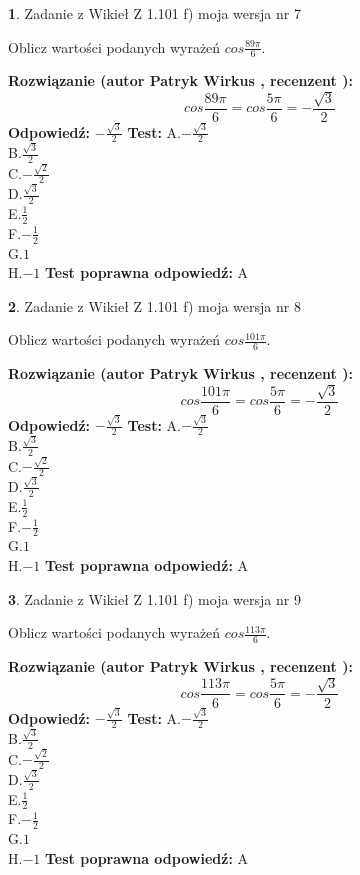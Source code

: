 \documentclass[12pt, a4paper]{article}
\theoremstyle{definition} %
\newtheorem{zad}{}
\newcommand{\zadStart}[1]{\begin{zad}#1\newline}
\newcommand{\zadStop}{\end{zad}}
\newcommand{\rozwStart}[2]{\noindent \textbf{Rozwiązanie (autor #1 , recenzent #2): }\newline}
\newcommand{\rozwStop}{\newline}
\newcommand{\odpStart}{\noindent \textbf{Odpowiedź:}\newline}
\newcommand{\odpStop}{\newline}
\newcommand{\testStart}{\noindent \textbf{Test:}\newline}
\newcommand{\testStop}{\newline}
\newcommand{\kluczStart}{\noindent \textbf{Test poprawna odpowiedź:}\newline}
\newcommand{\kluczStop}{\newline}
\begin{document}
\zadStart{Zadanie z Wikieł Z 1.101 f) moja wersja nr 7}

Oblicz wartości podanych wyrażeń $cos \frac{89\pi}{6}$.
\zadStop
\rozwStart{Patryk Wirkus}{}
$$cos \frac{89\pi}{6} = cos \frac{5\pi}{6} = -\frac{\sqrt{3}}{2}$$
\rozwStop
\odpStart
$-\frac{\sqrt{3}}{2}$
\odpStop
\testStart
A.$-\frac{\sqrt{3}}{2}$\\
B.$\frac{\sqrt{3}}{2}$\\
C.$-\frac{\sqrt{2}}{2}$\\
D.$\frac{\sqrt{3}}{2}$\\
E.$\frac{1}{2}$\\
F.$-\frac{1}{2}$\\
G.$1$\\
H.$-1$
\testStop
\kluczStart
A
\kluczStop



\zadStart{Zadanie z Wikieł Z 1.101 f) moja wersja nr 8}

Oblicz wartości podanych wyrażeń $cos \frac{101\pi}{6}$.
\zadStop
\rozwStart{Patryk Wirkus}{}
$$cos \frac{101\pi}{6} = cos \frac{5\pi}{6} = -\frac{\sqrt{3}}{2}$$
\rozwStop
\odpStart
$-\frac{\sqrt{3}}{2}$
\odpStop
\testStart
A.$-\frac{\sqrt{3}}{2}$\\
B.$\frac{\sqrt{3}}{2}$\\
C.$-\frac{\sqrt{2}}{2}$\\
D.$\frac{\sqrt{3}}{2}$\\
E.$\frac{1}{2}$\\
F.$-\frac{1}{2}$\\
G.$1$\\
H.$-1$
\testStop
\kluczStart
A
\kluczStop



\zadStart{Zadanie z Wikieł Z 1.101 f) moja wersja nr 9}

Oblicz wartości podanych wyrażeń $cos \frac{113\pi}{6}$.
\zadStop
\rozwStart{Patryk Wirkus}{}
$$cos \frac{113\pi}{6} = cos \frac{5\pi}{6} = -\frac{\sqrt{3}}{2}$$
\rozwStop
\odpStart
$-\frac{\sqrt{3}}{2}$
\odpStop
\testStart
A.$-\frac{\sqrt{3}}{2}$\\
B.$\frac{\sqrt{3}}{2}$\\
C.$-\frac{\sqrt{2}}{2}$\\
D.$\frac{\sqrt{3}}{2}$\\
E.$\frac{1}{2}$\\
F.$-\frac{1}{2}$\\
G.$1$\\
H.$-1$
\testStop
\kluczStart
A
\kluczStop
\end{document}

